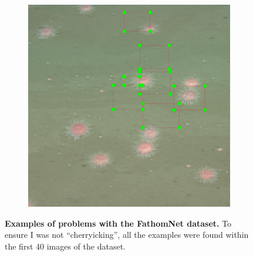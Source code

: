 \documentclass[12pt,a4paper,twoside,openany]{report}
\begin{document}
\begin{figure}[H]
\begin{subfigure}[b]{0.45\textwidth}
        \label{fig:fathomnet_missing}
    \end{subfigure}
    \hfill
    \begin{subfigure}[b]{0.45\textwidth}
        \centering
        \includegraphics[width=\textwidth]{figs/implementation/fathomnet_problems/incorrect.png}
        \label{fig:fathomnet_incorrect}
    \end{subfigure}
    
    \caption{\textbf{Examples of problems with the FathomNet dataset.} To ensure I was not ``cherryicking'', all the examples were found within the first 40 images of the dataset.}
    \label{fig:fathomnet_problems}
\end{figure}
\end{document}
